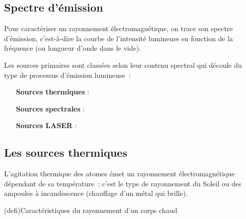 \documentclass[../../main/main.tex]{subfiles}
\begin{document}
\subsection{Spectre d'émission}

Pour caractériser un rayonnement électromagnétique, on trace son spectre
d'émission, c'est-à-dire la courbe de l'intensité lumineuse en fonction de la
fréquence (ou longueur d'onde dans le vide).

Les sources primaires sont classées selon leur contenu spectral
qui découle du type de processus d'émission lumineuse~:
\begin{itemize}[leftmargin=120pt]
	\item[\textbf{Sources thermiques}] : 
	\item[\textbf{Sources spectrales}] : 
	\item[\textbf{Sources LASER}] : 
\end{itemize}

\subsection{Les sources thermiques}

L'agitation thermique des atomes émet un rayonnement électromagnétique dépendant
de sa température~: c'est le type de rayonnement du Soleil ou des ampoules à
incandescence (chauffage d'un métal qui brille).

\begin{tcb*}(defi){Caractéristiques du rayonnement d'un corps chaud}

\end{tcb*}
\end{document}
